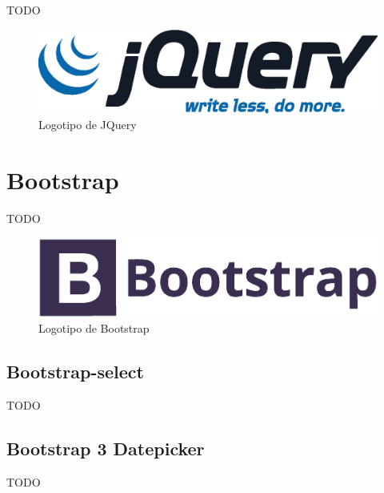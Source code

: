 TODO

\begin{figure}[!htbp]
	\centering
	\includegraphics[scale=0.6]{fig/jquery_logo}
	\caption{Logotipo de JQuery}
\end{figure}

\section{Bootstrap}

TODO

\begin{figure}[!htbp]
	\centering
	\includegraphics[scale=0.45]{fig/bootstrap_logo}
	\caption{Logotipo de Bootstrap}
\end{figure}

\subsection{Bootstrap-select}

TODO

\subsection{Bootstrap 3 Datepicker}

TODO